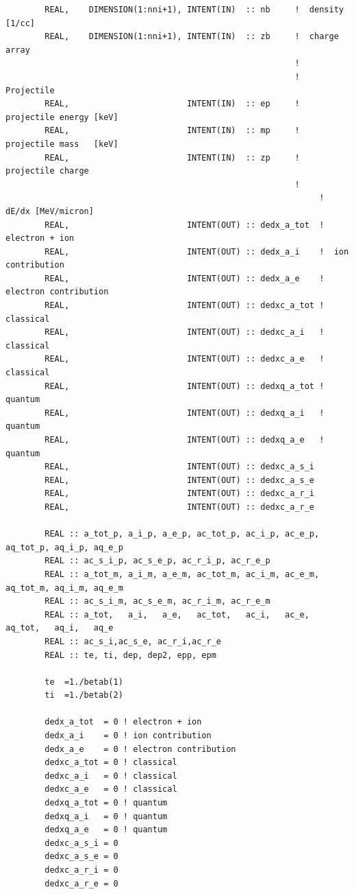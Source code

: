 \documentclass[preprint,12pt,eqsecnum,nofootinbib,amsmath,amssymb]{revtex4}
\begin{document}
{\begin{verbatim}
        REAL,    DIMENSION(1:nni+1), INTENT(IN)  :: nb     !  density [1/cc]
        REAL,    DIMENSION(1:nni+1), INTENT(IN)  :: zb     !  charge array
                                                           !
                                                           ! Projectile  
        REAL,                        INTENT(IN)  :: ep     !  projectile energy [keV]
        REAL,                        INTENT(IN)  :: mp     !  projectile mass   [keV]
        REAL,                        INTENT(IN)  :: zp     !  projectile charge
                                                           !
                                                                ! dE/dx [MeV/micron]
        REAL,                        INTENT(OUT) :: dedx_a_tot  !  electron + ion
        REAL,                        INTENT(OUT) :: dedx_a_i    !  ion contribution
        REAL,                        INTENT(OUT) :: dedx_a_e    !  electron contribution
        REAL,                        INTENT(OUT) :: dedxc_a_tot !  classical
        REAL,                        INTENT(OUT) :: dedxc_a_i   !  classical
        REAL,                        INTENT(OUT) :: dedxc_a_e   !  classical
        REAL,                        INTENT(OUT) :: dedxq_a_tot !  quantum
        REAL,                        INTENT(OUT) :: dedxq_a_i   !  quantum
        REAL,                        INTENT(OUT) :: dedxq_a_e   !  quantum
        REAL,                        INTENT(OUT) :: dedxc_a_s_i
        REAL,                        INTENT(OUT) :: dedxc_a_s_e
        REAL,                        INTENT(OUT) :: dedxc_a_r_i
        REAL,                        INTENT(OUT) :: dedxc_a_r_e

        REAL :: a_tot_p, a_i_p, a_e_p, ac_tot_p, ac_i_p, ac_e_p, aq_tot_p, aq_i_p, aq_e_p
        REAL :: ac_s_i_p, ac_s_e_p, ac_r_i_p, ac_r_e_p
        REAL :: a_tot_m, a_i_m, a_e_m, ac_tot_m, ac_i_m, ac_e_m, aq_tot_m, aq_i_m, aq_e_m
        REAL :: ac_s_i_m, ac_s_e_m, ac_r_i_m, ac_r_e_m
        REAL :: a_tot,   a_i,   a_e,   ac_tot,   ac_i,   ac_e,   aq_tot,   aq_i,   aq_e
        REAL :: ac_s_i,ac_s_e, ac_r_i,ac_r_e
        REAL :: te, ti, dep, dep2, epp, epm

        te  =1./betab(1)
        ti  =1./betab(2)

        dedx_a_tot  = 0 ! electron + ion
        dedx_a_i    = 0 ! ion contribution
        dedx_a_e    = 0 ! electron contribution
        dedxc_a_tot = 0 ! classical
        dedxc_a_i   = 0 ! classical
        dedxc_a_e   = 0 ! classical
        dedxq_a_tot = 0 ! quantum
        dedxq_a_i   = 0 ! quantum
        dedxq_a_e   = 0 ! quantum
        dedxc_a_s_i = 0 
        dedxc_a_s_e = 0 
        dedxc_a_r_i = 0 
        dedxc_a_r_e = 0 


\end{verbatim}}
\end{document}
